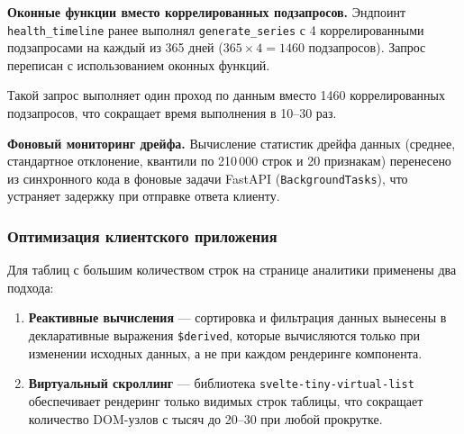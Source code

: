 \textbf{Оконные функции вместо коррелированных подзапросов.} Эндпоинт \texttt{health\_timeline} ранее выполнял \texttt{generate\_series} с 4 коррелированными подзапросами на каждый из 365 дней ($365 \times 4 = 1460$ подзапросов). Запрос переписан с использованием оконных функций.

Такой запрос выполняет один проход по данным вместо 1460 коррелированных подзапросов, что сокращает время выполнения в 10--30 раз.

\textbf{Фоновый мониторинг дрейфа.} Вычисление статистик дрейфа данных (среднее, стандартное отклонение, квантили по 210\,000 строк и 20 признакам) перенесено из синхронного кода в фоновые задачи FastAPI (\texttt{BackgroundTasks}), что устраняет задержку при отправке ответа клиенту.

\subsubsection{Оптимизация клиентского приложения}

Для таблиц с большим количеством строк на странице аналитики применены два подхода:

\begin{enumerate}
    \item \textbf{Реактивные вычисления} --- сортировка и фильтрация данных вынесены в декларативные выражения \texttt{\$derived}, которые вычисляются только при изменении исходных данных, а не при каждом рендеринге компонента.
    \item \textbf{Виртуальный скроллинг} --- библиотека \texttt{svelte-tiny-virtual-list} обеспечивает рендеринг только видимых строк таблицы, что сокращает количество DOM-узлов с тысяч до 20--30 при любой прокрутке.
\end{enumerate}

